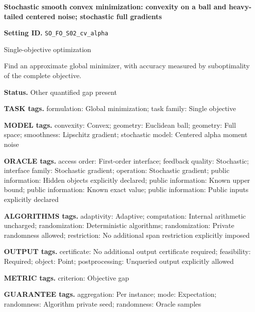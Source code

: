 \documentclass[10pt,a4paper]{article}
\begin{document}
\raggedright

{\LARGE\bfseries\sffamily\color{AtlasNavy} Stochastic smooth convex minimization: convexity on a ball and heavy-tailed centered noise; stochastic full gradients\par}\vspace{5pt}


\textbf{Setting ID.} \texttt{SO\_\allowbreak{}FO\_\allowbreak{}S02\_\allowbreak{}cv\_\allowbreak{}alpha}



Single-objective optimization



Find an approximate global minimizer, with accuracy measured by suboptimality of the complete objective.



\textbf{Status.} Other quantified gap present



\textbf{TASK tags.} formulation: Global minimization; task family: Single objective



\textbf{MODEL tags.} convexity: Convex; geometry: Euclidean ball; geometry: Full space; smoothness: Lipschitz gradient; stochastic model: Centered alpha moment noise



\textbf{ORACLE tags.} access order: First-order interface; feedback quality: Stochastic; interface family: Stochastic gradient; operation: Stochastic gradient; public information: Hidden objects explicitly declared; public information: Known upper bound; public information: Known exact value; public information: Public inputs explicitly declared



\textbf{ALGORITHMS tags.} adaptivity: Adaptive; computation: Internal arithmetic uncharged; randomization: Deterministic algorithms; randomization: Private randomness allowed; restriction: No additional span restriction explicitly imposed



\textbf{OUTPUT tags.} certificate: No additional output certificate required; feasibility: Required; object: Point; postprocessing: Unqueried output explicitly allowed



\textbf{METRIC tags.} criterion: Objective gap



\textbf{GUARANTEE tags.} aggregation: Per instance; mode: Expectation; randomness: Algorithm private seed; randomness: Oracle samples
\end{document}
